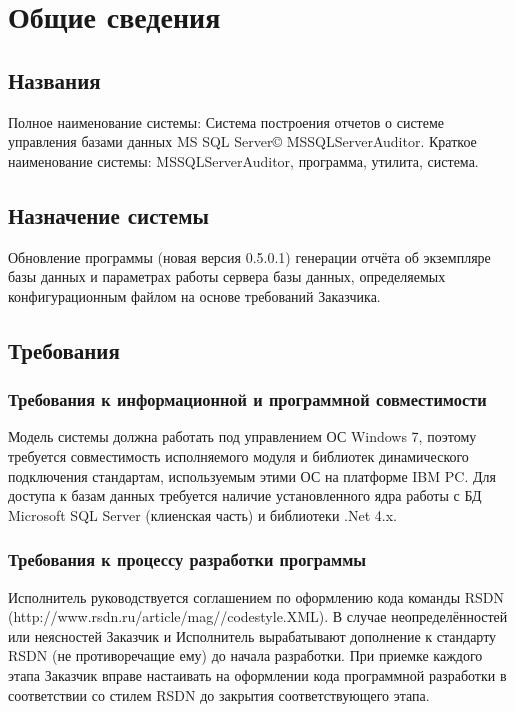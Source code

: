 \section{Общие сведения}

\subsection{Названия}

Полное наименование системы: Система построения отчетов о системе управления базами данных MS SQL
Server{\copyright} MSSQLServerAuditor. Краткое наименование системы: MSSQLServerAuditor, программа,
утилита, система.

\subsection{Назначение системы}

Обновление программы (новая версия 0.5.0.1) генерации отчёта об экземпляре базы данных и параметрах
работы сервера базы данных, определяемых конфигурационным файлом на основе требований Заказчика.

\subsection{Требования}

\subsubsection{Требования к информационной и программной совместимости}

Модель системы должна работать под управлением ОС Windows 7, поэтому требуется совместимость
исполняемого модуля и библиотек динамического подключения стандартам, используемым этими ОС на
платформе IBM PC. Для доступа к базам данных требуется наличие установленного ядра работы с БД
Microsoft SQL Server (клиенская часть) и библиотеки .Net 4.x.

\subsubsection{Требования к процессу разработки программы}

Исполнитель руководствуется соглашением по оформлению кода команды RSDN
(http://www.rsdn.ru/\-article\-/mag//\-codestyle.\-XML). В случае неопределённостей или
неясностей Заказчик и Исполнитель вырабатывают дополнение к стандарту RSDN (не противоречащие ему)
до начала разработки. При приемке каждого этапа Заказчик вправе настаивать на оформлении кода
программной разработки в соответствии со стилем RSDN до закрытия соответствующего этапа.

